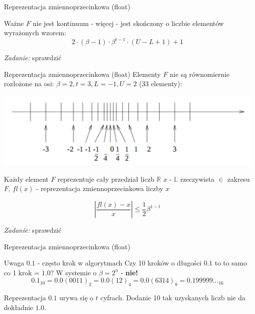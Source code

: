 \begin{frame}{Reprezentacja zmiennoprzecinkowa (float)}
    \begin{block}{Ważne}
    $F$ nie jest kontinuum - więcej - jest skończony o liczbie elementów wyrażonych wzorem:
    \[
    2 \cdot \left(\beta - 1 \right) \cdot \beta^{t-1} \cdot \left( U - L + 1 \right) + 1
    \]
    \begin{flushright}
        {\it Zadanie:} sprawdzić
    \end{flushright}
    \end{block}
\end{frame}
\begin{frame}{Reprezentacja zmiennoprzecinkowa (float)}
    Elementy $F$ nie są równomiernie rozłożone na osi:
    $\beta = 2, t = 3, L = -1, U = 2$ \hspace{5mm} (33 elementy):
    \begin{center}
    \includegraphics[width=0.8\linewidth]{img/2/2_1_axis}
    \end{center}

    Każdy element $F$ reprezentuje cały przedział liczb $\mathbb{R}$\newline 
    $x$ - l. rzeczywista $\in$ zakresu $F$,\newline
    $fl(x)$ - reprezentacja zmiennoprzecinkowa liczby $x$

    \[
    \left| \frac{fl(x) - x}{x} \right| \le \frac{1}{2} \beta^{1-t}
    \]

    \begin{flushright}
        {\it Zadanie:} sprawdzić
    \end{flushright}
\end{frame}
\begin{frame}{Reprezentacja zmiennoprzecinkowa (float)}
    \begin{alertblock}{Uwaga}
        $0.1$ - często krok w algorytmach\newline
        Czy 10 kroków o długości $0.1$ to to samo co 1 krok = $1.0$?\newline
        W systemie o $\beta = 2^n$ - {\bf nie!}
        \[
        0.1_{10} = 0.0(0011)_2 = 0.0(12)_4 = 0.0(6314)_8 = 0.199999..._{16}
        \]

        Reprezentacja $0.1$ urywa się o $t$ cyfrach. Dodanie 10 tak uzyskanych liczb nie da dokładnie $1.0$.
    \end{alertblock}
\end{frame}
